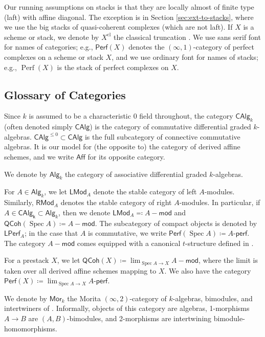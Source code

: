 \documentclass{article}
\numberwithin{equation}{section}
\theoremstyle{quest}
\theoremstyle{definition}
\theoremstyle{remark}
\newcommand{\msf}{\mathsf}
\newcommand{\Mod}{-\msf{mod}}
\DeclareMathOperator{\Spec}{Spec}
\DeclareMathOperator{\Perf}{Perf}
\begin{document}
Our running assumptions on stacks is that they are locally almost of finite type (laft) with affine diagonal. The exception is in Section \ref{sec:ext-to-stacks}, where we use the big stacks of quasi-coherent complexes (which are not laft). If $X$ is a scheme or stack, we denote by $X^\text{cl}$ the classical truncation \cite[Chapter 2]{GR}. We use sans serif font for names of categories; e.g., $\mathsf{Perf}(X)$ denotes the $(\infty,1)$-category of perfect complexes on a scheme or stack $X$, and we use ordinary font for names of stacks; e.g., $\Perf(X)$ is the stack of perfect complexes on $X$.

\subsection{Glossary of Categories}
Since $k$ is assumed to be a characteristic $0$ field throughout, the category $\mathsf{CAlg}_k$ (often denoted simply $\mathsf{CAlg}$) is the category of commutative differential graded $k$-algebras. $\mathsf{CAlg}^{\le 0}\subset \mathsf{CAlg}$ is the full subcategory of connective commutative algebras. It is our model for (the opposite to) the category of derived affine schemes, and we write $\mathsf{Aff}$ for its opposite category.

We denote by $\mathsf{Alg}_k$ the category of associative differential graded $k$-algebras.

For $A \in \mathsf{Alg}_k$, we let $\mathsf{LMod}_A$ denote the stable category of left $A$-modules. Similarly, $\mathsf{RMod}_A$ denotes the stable category of right $A$-modules. In particular, if $A\in \mathsf{CAlg_k}\subset \mathsf{Alg}_k$, then we denote $\mathsf{LMod}_A\eqcolon A\Mod$ and $\mathsf{QCoh}(\Spec A)\coloneqq A\Mod$. The subcategory of compact objects is denoted by $\mathsf{LPerf}_A$; in the case that $A$ is commutative, we write $\mathsf{Perf}(\Spec A)\coloneqq A\text{-}\mathsf{perf}$. The category $A\Mod$ comes equipped with a canonical $t$-structure defined in \cite[Chapter 2 Section 1.2]{GR}.

For a prestack $X$, we let $\mathsf{QCoh}(X)\coloneqq \lim_{\Spec A \to X} A\Mod$, where the limit is taken over all derived affine schemes mapping to $X$. We also have the category $\mathsf{Perf}(X)\coloneqq \lim_{\Spec A \to X}A\text{-}\mathsf{perf}$.

We denote by $\mathsf{Mor}_k$ the Morita $(\infty,2)$-category of $k$-algebras, bimodules, and intertwiners of \cite{haugseng-definition-of-morita-bicat}. Informally, objects of this category are algebras, 1-morphisms $A\to B$ are $(A,B)$-bimodules, and 2-morphisms are intertwining bimodule-homomorphisms.
\end{document}
